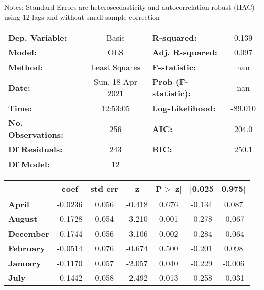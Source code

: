 Notes: \newline
 [1] Standard Errors are heteroscedasticity and autocorrelation robust (HAC) using 12 lags and without small sample correction
\begin{center}
\begin{tabular}{lclc}
\toprule
\textbf{Dep. Variable:}    &      Basis       & \textbf{  R-squared:         } &     0.139   \\
\textbf{Model:}            &       OLS        & \textbf{  Adj. R-squared:    } &     0.097   \\
\textbf{Method:}           &  Least Squares   & \textbf{  F-statistic:       } &       nan   \\
\textbf{Date:}             & Sun, 18 Apr 2021 & \textbf{  Prob (F-statistic):} &      nan    \\
\textbf{Time:}             &     12:53:05     & \textbf{  Log-Likelihood:    } &   -89.010   \\
\textbf{No. Observations:} &         256      & \textbf{  AIC:               } &     204.0   \\
\textbf{Df Residuals:}     &         243      & \textbf{  BIC:               } &     250.1   \\
\textbf{Df Model:}         &          12      & \textbf{                     } &             \\
\bottomrule
\end{tabular}
\begin{tabular}{lcccccc}
                   & \textbf{coef} & \textbf{std err} & \textbf{z} & \textbf{P$> |$z$|$} & \textbf{[0.025} & \textbf{0.975]}  \\
\midrule
\textbf{April}     &      -0.0236  &        0.056     &    -0.418  &         0.676        &       -0.134    &        0.087     \\
\textbf{August}    &      -0.1728  &        0.054     &    -3.210  &         0.001        &       -0.278    &       -0.067     \\
\textbf{December}  &      -0.1744  &        0.056     &    -3.106  &         0.002        &       -0.284    &       -0.064     \\
\textbf{February}  &      -0.0514  &        0.076     &    -0.674  &         0.500        &       -0.201    &        0.098     \\
\textbf{January}   &      -0.1170  &        0.057     &    -2.057  &         0.040        &       -0.229    &       -0.006     \\
\textbf{July}      &      -0.1442  &        0.058     &    -2.492  &         0.013        &       -0.258    &       -0.031     \\

\end{tabular}
\end{center}
